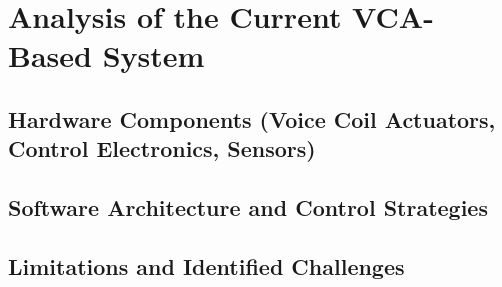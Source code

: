 \chapter{Analysis of the Current VCA-Based System}

\section{Hardware Components (Voice Coil Actuators, Control Electronics, Sensors)}

\section{Software Architecture and Control Strategies}

\section{Limitations and Identified Challenges}

